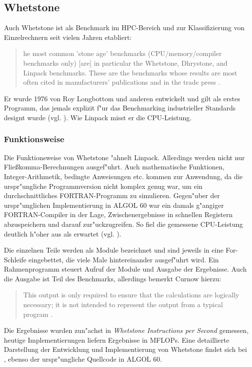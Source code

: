 \subsection{Whetstone}\label{Whetstone}

Auch Whetstone ist als Benchmark im HPC-Bereich und zur Klassifizierung von Einzelrechnern seit vielen Jahren etabliert:
\begin{quote}
\onehalfspacing
[T]he most common 'stone age' benchmarks (CPU/memory/compiler benchmarks only) [are] in particular the Whetstone, Dhrystone, and Linpack benchmarks. These are the benchmarks whose results are most often cited in manufacturers' publications and in the trade press \cite{wei90}.
\end{quote}
Er wurde 1976 von Roy Longbottom und anderen entwickelt und gilt als erstes Programm, das jemals explizit f"ur das Benchmarking industrieller Standards designt wurde (vgl. \cite{wei90}). Wie Linpack misst er die CPU-Leistung. 

\subsubsection{Funktionsweise}\label{Funktion-Whetstone}

Die Funktionsweise von Whetstone "ahnelt Linpack. Allerdings werden nicht nur Flie\ss komma-Berechnungen ausgef"uhrt. Auch mathematische Funktionen, Integer-Arithmetik, bedingte Anweisungen etc. kommen zur Anwendung, da die urspr"ungliche Programmversion nicht komplex genug war, um ein durchschnittliches FORTRAN-Programm zu simulieren. Gegen"uber der urspr"unglichen Implementierung in ALGOL 60 war ein damals g"angiger FOR\-TRAN-Compiler in der Lage, Zwischenergebnisse in schnellen Registern abzuspeichern und darauf zur"uckzugreifen. So fiel die gemessene CPU-Leistung deutlich h"oher aus als erwartet (vgl. \cite{cur76}). 

Die einzelnen Teile werden als Module bezeichnet und sind jeweils in eine For-Schleife eingebettet, die viele Male  hintereinander ausgef"uhrt wird. Ein Rahmenprogramm steuert Aufruf der Module und Ausgabe der Ergebnisse. Auch die Ausgabe ist Teil des Benchmarks, allerdings bemerkt Curnow hierzu: 
\begin{quote}
\onehalfspacing
This output is only required to ensure that the calculations are logically necessary; it is not intended to represent the output from a typical program \cite{cur76}. 
\end{quote}
Die Ergebnisse wurden zun"achst in \textit{Whetstone Instructions per Second} gemessen, heutige Implementierungen liefern Ergebnisse in MFLOPs. Eine detaillierte Darstellung der Entwicklung und Implementierung von Whetstone findet sich bei \cite{cur76}, ebenso der urspr"ungliche Quellcode in ALGOL 60. 

